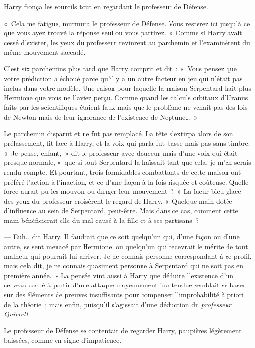 Harry fronça les sourcils tout en regardant le professeur de Défense.

«~Cela me fatigue, murmura le professeur de Défense. Vous resterez ici jusqu'à ce que vous ayez trouvé la réponse seul ou vous partirez.~» Comme si Harry avait cessé d'exister, les yeux du professeur revinrent au parchemin et l'examinèrent du même mouvement saccadé.

C'est six parchemins plus tard que Harry comprit et dit~: «~Vous pensez que votre prédiction a échoué parce qu'il y a un autre facteur en jeu qui n'était pas inclus dans votre modèle. Une raison pour laquelle la maison Serpentard hait plus Hermione que vous ne l'aviez perçu. Comme quand les calculs orbitaux d'Uranus faits par les scientifiques étaient faux mais que le problème ne venait pas des lois de Newton mais de leur ignorance de l'existence de Neptune…~»

Le parchemin disparut et ne fut pas remplacé. La tête s'extirpa alors de son prélassement, fit face à Harry, et la voix qui parla fut basse mais pas sans timbre. «~Je pense, enfant,~» dit le professeur avec douceur mais d'une voix qui était presque normale, «~que si tout Serpentard la haïssait tant que cela, je m'en serais rendu compte. Et pourtant, trois formidables combattants de cette maison ont préféré l'action à l'inaction, et ce d'une façon à la fois risquée et coûteuse. Quelle force aurait pu les mouvoir ou diriger leur mouvement~?~» La lueur bleu glacé des yeux du professeur croisèrent le regard de Harry. «~Quelque main dotée d'influence au sein de Serpentard, peut-être. Mais dans ce cas, comment cette main bénéficierait-elle du mal causé à la fille et à ses partisans~?

--- Euh… dit Harry. Il faudrait que ce soit quelqu'un qui, d'une façon ou d'une autre, se sent menacé par Hermione, ou quelqu'un qui recevrait le mérite de tout malheur qui pourrait lui arriver. Je ne connais personne correspondant à ce profil, mais cela dit, je ne connais quasiment personne à Serpentard qui ne soit pas en première année.~» La pensée vint aussi à Harry que déduire l'existence d'un cerveau caché à partir d'une attaque moyennement inattendue semblait se baser sur des éléments de preuves insuffisants pour compenser l'improbabilité à priori de la théorie~; mais enfin, puisqu'il s'agissait d'une déduction du \emph{professeur Quirrell}…

Le professeur de Défense se contentait de regarder Harry, paupières légèrement baissées, comme en signe d'impatience.

